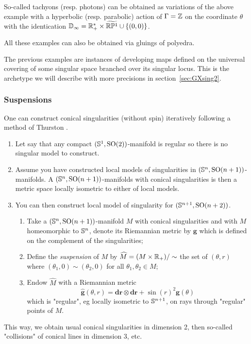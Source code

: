 \begin{ex}
\begin{itemize}
 \end{itemize}

So-called tachyons (resp. photons) can be obtained as variations of the above example with a hyperbolic (resp. parabolic)  action of $\Gamma=\mathbb{Z}$ on the coordinate $\theta$ with the identication $\mathbb{D}_\infty = \mathbb R_+^*\times \widetilde {\mathbb R\mathbb P^1} \cup \{(0,0)\}$.

All these examples can also be obtained via gluings of polyedra.
\end{ex}

\begin{rem}\label{rem:previous_examples_instances_developing}
 The previous examples are instances of developing maps defined on the universal covering of some singular space branched over its singular locus. This is the archetype we will describe with more precisions in section~\ref{sec:GXsing2}.
\end{rem}


\subsubsection{Suspensions} \label{sec:susp}

One can construct conical singularities (without spin) iteratively following a method of Thurston \cite{MR1668340}. 
\begin{enumerate}
 \item Let say that any compact $(\mathbb{S}^1,\mathrm{SO}(2))$-manifold is regular so there is no singular model to construct. 
 \item Assume you have constructed local models of singularities in $(\mathbb{S}^n,\mathrm{SO}(n+1))$-manifolds. A $(\mathbb{S}^n,\mathrm{SO}(n+1))$-manifolds with conical singularities is then a metric space locally isometric to either of local models.
 \item You can then construct local model of singularity for $(\mathbb{S}^{n+1},\mathrm{SO}(n+2))$.
 \begin{enumerate}
 \item Take a $(\mathbb{S}^n,\mathrm{SO}(n+1))$-manifold $M$ with conical singularities and with $M$ homeomorphic to $\mathbb{S}^n$,  denote its Riemannian metric by $\mathbf{g}$ which is defined on the complement of the singularities;  
 \item Define the {\it suspension} of $M$ by 
 $\widehat M = (M\times \mathbb R_+)/\sim$ the set of $(\theta,r)$ where $(\theta_1,0)\sim (\theta_2,0)$ for all $\theta_1,\theta_2\in M$; 
 \item Endow $\widehat M$ with a Riemannian metric $$\widehat{\mathbf{g}}(\theta,r) = \mathbf{d r}\otimes \mathbf{d r}+  \sin(r)^2 \mathbf{g}(\theta)$$ which is "regular", eg locally isometric to $\mathbb{S}^{n+1}$, on rays through "regular" points of $M$.  
 \end{enumerate}
\end{enumerate}
This way, we obtain usual conical singularities in dimension 2, then so-called "collisions" of conical lines in dimension 3, etc.

